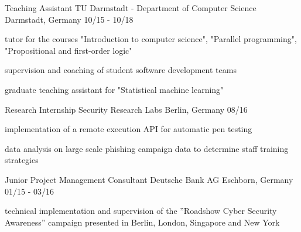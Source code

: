 \begin{cventries}
  \cventry
    {Teaching Assistant} %
    {TU Darmstadt - Department of Computer Science} %
    {Darmstadt, Germany} %
    {10/15 - 10/18} %
    {
      \begin{cvitems} %
        \item {tutor for the courses "Introduction to computer science", "Parallel programming", "Propositional and first-order logic"}
        \item {supervision and coaching of student software development teams}
        \item {graduate teaching assistant for "Statistical machine learning"}
      \end{cvitems}
    }

  \cventry
    {Research Internship} %
    {Security Research Labs} %
    {Berlin, Germany} %
    {08/16} %
    {
      \begin{cvitems} %
        \item {implementation of a remote execution API for automatic pen testing}
        \item {data analysis on large scale phishing campaign data to determine staff training strategies}
      \end{cvitems}
    }

  \cventry
    {Junior Project Management Consultant} %
    {Deutsche Bank AG} %
    {Eschborn, Germany} %
    {01/15 - 03/16} %
    {
      \begin{cvitems} %
        \item {technical implementation and supervision of the ”Roadshow Cyber Security
Awareness” campaign presented in Berlin, London, Singapore and New York}
      \end{cvitems}
    }

\end{cventries}
